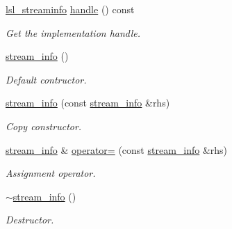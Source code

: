 \begin{DoxyCompactItemize}
\mbox{\label{classlsl_1_1stream__info_a532f6e8b29052cf11fbf87aeb3424304}} 
\hyperlink{namespacelsl_aa0a9ce9956061679949daa2e35aae2e8}{lsl\+\_\+streaminfo} \hyperlink{classlsl_1_1stream__info_a532f6e8b29052cf11fbf87aeb3424304}{handle} () const
\begin{DoxyCompactList}\small\item\em Get the implementation handle. \end{DoxyCompactList}\item 
\mbox{\label{classlsl_1_1stream__info_a780a9289cc6f1d57215ed297aecfc78b}} 
\hyperlink{classlsl_1_1stream__info_a780a9289cc6f1d57215ed297aecfc78b}{stream\+\_\+info} ()
\begin{DoxyCompactList}\small\item\em Default contructor. \end{DoxyCompactList}\item 
\mbox{\label{classlsl_1_1stream__info_a82fd071574212a20ba4faffac5ce7803}} 
\hyperlink{classlsl_1_1stream__info_a82fd071574212a20ba4faffac5ce7803}{stream\+\_\+info} (const \hyperlink{classlsl_1_1stream__info}{stream\+\_\+info} \&rhs)
\begin{DoxyCompactList}\small\item\em Copy constructor. \end{DoxyCompactList}\item 
\mbox{\label{classlsl_1_1stream__info_a8ce8011b9da9b90c8e11e5c1c477a0a2}} 
\hyperlink{classlsl_1_1stream__info}{stream\+\_\+info} \& \hyperlink{classlsl_1_1stream__info_a8ce8011b9da9b90c8e11e5c1c477a0a2}{operator=} (const \hyperlink{classlsl_1_1stream__info}{stream\+\_\+info} \&rhs)
\begin{DoxyCompactList}\small\item\em Assignment operator. \end{DoxyCompactList}\item 
\mbox{\label{classlsl_1_1stream__info_afe4bf312984faef204ee4480385a9bc1}} 
\hyperlink{classlsl_1_1stream__info_afe4bf312984faef204ee4480385a9bc1}{$\sim$stream\+\_\+info} ()
\begin{DoxyCompactList}\small\item\em Destructor. \end{DoxyCompactList}\end{DoxyCompactItemize}

